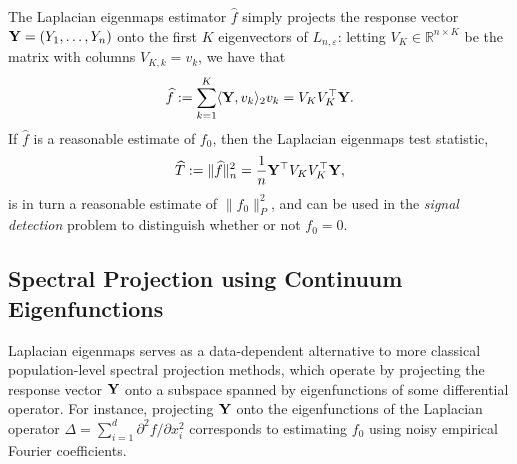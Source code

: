 \documentclass[aos]{imsart}
\theoremstyle{plain}
\theoremstyle{definition}
\theoremstyle{remark}
\def\R{\mathbb{R}}
\newcommand{\dotp}[2]{\langle #1, #2 \rangle}
\newcommand{\wh}[1]{\widehat{#1}}
\newcommand{\Reals}{\mathbb{R}} %
\newcommand{\1}{\mathbf{1}}
\begin{document}
The Laplacian eigenmaps estimator $\wh{f}$ simply projects the response vector ${\bf Y} = (Y_1,\ldots,Y_n)$ onto the first $K$ eigenvectors of $L_{n,\varepsilon}$: letting $V_K \in \Reals^{n \times K}$ be the matrix with columns $V_{K,k} = v_k$, we have that
\begin{equation}
\label{eqn:laplacian_eigenmaps_estimator}
\wh{f} := \sum_{k = 1}^{K} \dotp{{\bf Y}}{v_k}_{2} v_k = V_K V_K^{\top} {\bf Y}.
\end{equation} 
If $\wh{f}$ is a reasonable estimate of $f_0$, then the Laplacian eigenmaps test statistic,
\begin{equation}
\label{eqn:laplacian_eigenmaps_test}
\wh{T} := \|\wh{f}\|_n^2 = \frac{1}{n} {\bf Y}^{\top} V_K V_K^{\top} {\bf Y},
\end{equation}
is in turn a reasonable estimate of $\|f_0\|_{P}^2$, and can be used in the \emph{signal detection} problem to distinguish whether or not $f_0 = 0$.

\subsection{Spectral Projection using Continuum Eigenfunctions}
\label{subsec:spectral_projection}
Laplacian eigenmaps serves as a data-dependent alternative to more classical population-level spectral projection methods, which operate by projecting the response vector ${\bf Y}$ onto a subspace spanned by eigenfunctions of some differential operator. For instance, projecting ${\bf Y}$ onto the eigenfunctions of the Laplacian operator $\Delta = \sum_{i = 1}^{d} \partial^2f/\partial x_i^2$ corresponds to estimating $f_0$ using noisy empirical Fourier coefficients.
\end{document}

